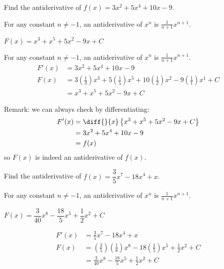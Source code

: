 \begin{Mquestion}\label{s4.1antifirst}
Find the  antiderivative of
$f(x)=3x^2+5x^4+10x-9$.
\end{Mquestion}
\begin{hint}
For any constant $n \neq -1$, an antiderivative of $x^n$ is $\frac{1}{n+1}x^{n+1}$.
\end{hint}
\begin{answer}
$F(x)=x^3+x^5+5x^2-9x+C$
\end{answer}
\begin{solution}
For any constant $n \neq -1$, an antiderivative of $x^n$ is $\frac{1}{n+1}x^{n+1}$.
\begin{align*}
F'(x)&=3x^2+5x^4+10x-9\\
F(x)&=3\left(\frac{1}{3}\right)x^3+5\left(\frac{1}{5}\right)x^5+10\left(\frac{1}{2}\right)x^2-9\left(\frac{1}{1}\right)x^1+C\\
&=x^3+x^5+5x^2-9x+C
\end{align*}

Remark: we can always check by differentiating:
\begin{align*}
F'(x)&=\diff{}{x}\left\{x^3+x^5+5x^2-9x+C\right\}\\
&=3x^2+5x^4+10x-9\\
&=f(x)
\end{align*}
so  $F(x)$ is indeed an antiderivative of $f(x)$.
\end{solution}


\begin{question}
Find the  antiderivative of
$f(x)=\dfrac{3}{5}x^7-18x^4+x$.
\end{question}
\begin{hint}
For any constant $n \neq -1$, an antiderivative of $x^n$ is $\frac{1}{n+1}x^{n+1}$.
\end{hint}
\begin{answer}
$F(x)=\dfrac{3}{40}x^8-\dfrac{18}{5}x^5+\dfrac{1}{2}x^2+C$
\end{answer}
\begin{solution}
\begin{align*}
F'(x)&=\frac{3}{5}x^7-18x^4+x\\
F(x)&=\left(\frac{3}{5}\right)\left(\frac{1}{8}\right)x^8-18\left(\frac{1}{5}\right)x^5+\frac{1}{2}x^2+C\\
&=\frac{3}{40}x^8-\frac{18}{5}x^5+\frac{1}{2}x^2+C
\end{align*}
\end{solution}


